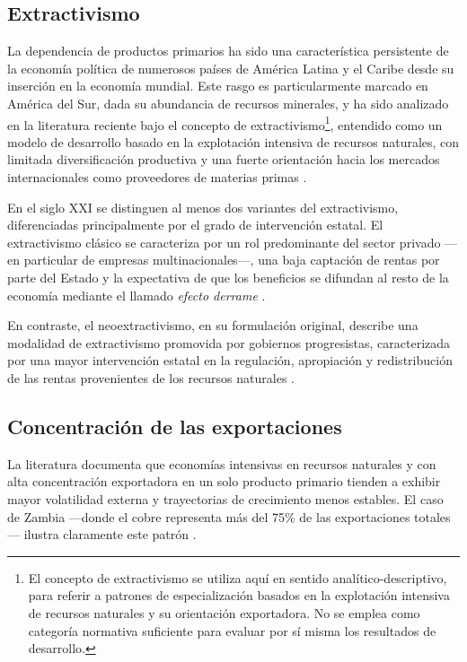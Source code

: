 \documentclass[../../TFM.tex]{subfiles}
\begin{document}
	\subsection{Extractivismo}
	\label{subsec:extractivismo}
	
	La dependencia de productos primarios ha sido una característica persistente de la economía política de numerosos países de América Latina y el Caribe desde su inserción en la economía mundial. Este rasgo es particularmente marcado en América del Sur, dada su abundancia de recursos minerales, y ha sido analizado en la literatura reciente bajo el concepto de extractivismo\footnote{El concepto de extractivismo se utiliza aquí en sentido analítico-descriptivo, para referir a patrones de especialización basados en la explotación intensiva de recursos naturales y su orientación exportadora. No se emplea como categoría normativa suficiente para evaluar por sí misma los resultados de desarrollo.}, entendido como un modelo de desarrollo basado en la explotación intensiva de recursos naturales, con limitada diversificación productiva y una fuerte orientación hacia los mercados internacionales como proveedores de materias primas \parencite{Agramont-Lechn2024}.
	
	En el siglo XXI se distinguen al menos dos variantes del extractivismo, diferenciadas principalmente por el grado de intervención estatal. El extractivismo clásico se caracteriza por un rol predominante del sector privado —en particular de empresas multinacionales—, una baja captación de rentas por parte del Estado y la expectativa de que los beneficios se difundan al resto de la economía mediante el llamado \textit{efecto derrame} \parencite{Gudynas2018}.
	
	En contraste, el neoextractivismo, en su formulación original, describe una modalidad de extractivismo promovida por gobiernos progresistas, caracterizada por una mayor intervención estatal en la regulación, apropiación y redistribución de las rentas provenientes de los recursos naturales \parencite{Gudynas2018}.
	
	\subsection{Concentración de las exportaciones}
	\label{subsec:concentracion-exportaciones}
	
	La literatura documenta que economías intensivas en recursos naturales y con alta concentración exportadora en un solo producto primario tienden a exhibir mayor volatilidad externa y trayectorias de crecimiento menos estables. El caso de Zambia —donde el cobre representa más del 75\% de las exportaciones totales— ilustra claramente este patrón \parencite{Lwazi2022}.
	
\end{document}
